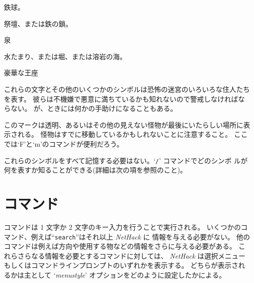 鉄球。
\item[\tb{_}]
祭壇、または鉄の鎖。
\item[\tb{\{}]
泉
\item[\tb{\}}]
水たまり、または堀、または溶岩の海。
\item[\tb{$\backslash$}]
豪華な王座
\item[\tb{"a-zA-Z およびその他のシンボル}]
これらの文字とその他のいくつかのシンボルは恐怖の迷宮のいろいろな住人たちを表す。
彼らは不機嫌で悪意に満ちているかも知れないので警戒しなければならない。
が、ときには何かの手助けになることもある。
\item[\tb{I}]
このマークは透明、あるいはその他の見えない怪物が最後にいたらしい場所に表示される。
怪物はすでに移動しているかもしれないことに注意すること。
ここでは`F'と`m'のコマンドが便利だろう。

\elist
これらのシンボルをすべて記憶する必要はない。`{\tt /}' コマンドでどのシンボ
ルが何を表すか知ることができる(詳細は次の項を参照のこと)。

\section{コマンド}

コマンドは 1 文字か 2 文字のキー入力を行うことで実行される。
いくつかのコマンド、例えば``{\tt search}''はそれ以上 {\it NetHack\/} に
情報を与える必要がない。
他のコマンドは例えば方向や使用する物などの情報をさらに与える必要がある。
これらさらなる情報を必要とするコマンドに対しては、
{\it NetHack\/} は選択メニューもしくはコマンドラインプロンプトのいずれかを表示する。
どちらが表示されるかは主として
`{\it menustyle\/}'
オプションをどのように設定したかによる。

